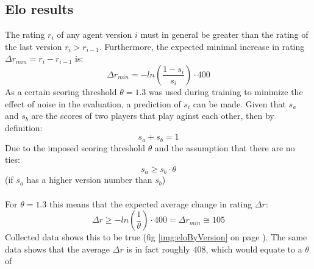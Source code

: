 \documentclass[12pt]{article}
\newcommand{\imgRef}[1]{(fig \ref{#1} on page \pageref{#1})}
\newcommand{\FittedEloRaiting}{408}
\begin{document}
\subsection{Elo results}
The rating \(r_i\) of any agent version \(i\) must in general be greater than the rating of the last version \(r_i > r_{i-1}\). Furthermore, the expected minimal increase in rating \(\Delta r_{min} = r_i - r_{i-1}\) is:
\begin{equation}
\Delta r_{min} = -ln\left(\frac{1-s_i}{s_i}\right)\cdot 400
\end{equation}
As a certain scoring threshold \(\theta = 1.3\) was used during training to minimize the effect of noise in the evaluation, a prediction of \(s_i\) can be made. Given that \(s_a\) and \(s_b\) are the scores of two players that play aginst each other, then by definition:
\begin{equation}
s_a + s_b = 1
\end{equation}
Due to the imposed scoring threshold \(\theta\) and the assumption that there are no ties:
\begin{equation}
s_a \geqslant s_b \cdot \theta
\end{equation}
(if \(s_a\) has a higher version number than \(s_b\))\\\\For \(\theta = 1.3\) this means that the expected average change in rating \(\Delta r\):
\begin{equation}
\Delta r \geqslant -ln\left(\frac{1}{\theta}\right)\cdot 400 = \Delta r_{min} \cong 105
\end{equation}
Collected data shows this to be true \imgRef{img:eloByVersion}. The same data shows that the average \(\Delta r \) is in fact roughly \(\FittedEloRaiting\), which would equate to a \(\theta\) of
\end{document}
